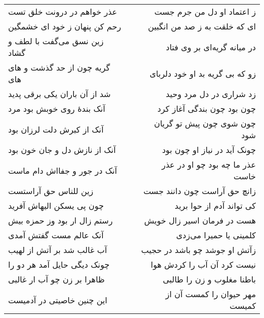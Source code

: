 \begin{center}
\begin{longtable}{l p{0.5cm} r}
عذر خواهم در درونت خلق تست
&&
ز اعتماد او دل من جرم جست
\\
رحم کن پنهان ز خود ای خشمگین
&&
ای که خلقت به ز صد من انگبین
\\
زین نسق می‌گفت با لطف و گشاد
&&
در میانه گریه‌ای بر وی فتاد
\\
گریه چون از حد گذشت و های های
&&
زو که بی گریه بد او خود دلربای
\\
شد از آن باران یکی برقی پدید
&&
زد شراری در دل مرد وحید
\\
آنک بندهٔ روی خوبش بود مرد
&&
چون بود چون بندگی آغاز کرد
\\
آنک از کبرش دلت لرزان بود
&&
چون شوی چون پیش تو گریان شود
\\
آنک از نازش دل و جان خون بود
&&
چونک آید در نیاز او چون بود
\\
آنک در جور و جفااش دام ماست
&&
عذر ما چه بود چو او در عذر خاست
\\
زین للناس حق آراستست
&&
زانچ حق آراست چون دانند جست
\\
چون پی یسکن الیهاش آفرید
&&
کی تواند آدم از حوا برید
\\
رستم زال ار بود وز حمزه بیش
&&
هست در فرمان اسیر زال خویش
\\
آنک عالم مست گفتش آمدی
&&
کلمینی یا حمیرا می‌زدی
\\
آب غالب شد بر آتش از لهیب
&&
زآتش او جوشد چو باشد در حجیب
\\
چونک دیگی حایل آمد هر دو را
&&
نیست کرد آن آب را کردش هوا
\\
ظاهرا بر زن چو آب ار غالبی
&&
باطنا مغلوب و زن را طالبی
\\
این چنین خاصیتی در آدمیست
&&
مهر حیوان را کمست آن از کمیست
\\
\end{longtable}
\end{center}
